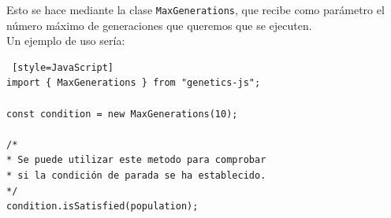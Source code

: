 Esto se hace mediante la clase \texttt{MaxGenerations}, que recibe como parámetro el número máximo de generaciones que queremos que se ejecuten.\\

Un ejemplo de uso sería: \\

\begin{lstlisting} [style=JavaScript]
import { MaxGenerations } from "genetics-js";

const condition = new MaxGenerations(10);

/*
* Se puede utilizar este metodo para comprobar
* si la condición de parada se ha establecido.
*/
condition.isSatisfied(population);
\end{lstlisting}